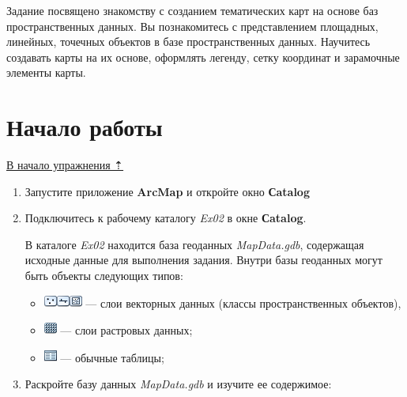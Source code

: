 \documentclass[12pt,]{book}
\providecommand{\tightlist}{%
  \setlength{\itemsep}{0pt}\setlength{\parskip}{0pt}}
\begin{document}
Задание посвящено знакомству с созданием тематических карт на основе баз пространственных данных. Вы познакомитесь с представлением площадных, линейных, точечных объектов в базе пространственных данных. Научитесь создавать карты на их основе, оформлять легенду, сетку координат и зарамочные элементы карты.

\hypertarget{map-design-general-begin}{%
\section{Начало работы}\label{map-design-general-begin}}

\protect\hyperlink{map-design-general}{В начало упражнения ⇡}

\begin{enumerate}
\def\labelenumi{\arabic{enumi}.}
\item
  Запустите приложение \textbf{ArcMap} и откройте окно \textbf{Сatalog}
\item
  Подключитесь к рабочему каталогу \emph{Ex02} в окне \textbf{Сatalog}.

  В каталоге \emph{Ex02} находится база геоданных \emph{MapData.gdb}, содержащая исходные данные для выполнения задания. Внутри базы геоданных могут быть объекты следующих типов:

  \begin{itemize}
  \tightlist
  \item
    \includegraphics{images/Ex02/image5.png}\includegraphics{images/Ex02/image6.png}\includegraphics{images/Ex02/image7.png} --- слои векторных данных (классы пространственных объектов),
  \item
    \includegraphics{images/Ex02/image8.png} --- слои растровых данных;
  \item
    \includegraphics{images/Ex02/image9.png} --- обычные таблицы;
  \end{itemize}
\item
  Раскройте базу данных \emph{MapData.gdb} и изучите ее содержимое:


\end{enumerate}
\end{document}
